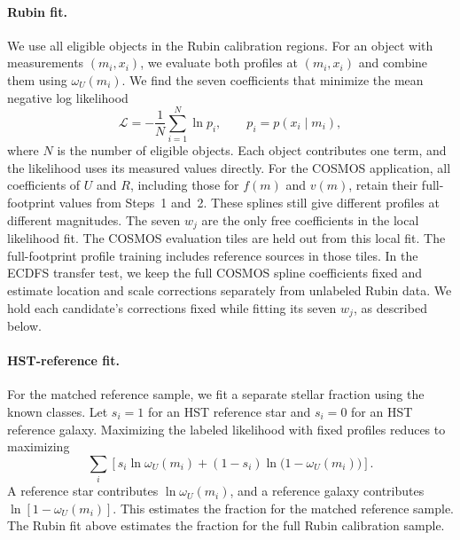 \paragraph{Rubin fit.}
We use all eligible objects in the Rubin calibration regions. For an
object with measurements \((m_i,x_i)\), we evaluate both profiles at
\((m_i,x_i)\) and combine them using \(\omega_U(m_i)\). We find the
seven coefficients that minimize the mean negative log likelihood
\[
 \mathcal L=-\frac{1}{N}\sum_{i=1}^{N}\ln p_i,
 \qquad p_i=p(x_i\mid m_i),
\]
where \(N\) is the number of eligible objects. Each object contributes
one term, and the likelihood uses its measured values directly.
For the COSMOS application, all coefficients of \(U\) and \(R\),
including those for \(f(m)\) and \(v(m)\), retain their full-footprint
values from Steps~1 and~2. These splines still give different profiles
at different magnitudes. The seven \(w_j\) are the only free coefficients
in the local likelihood fit. The COSMOS evaluation tiles are held out
from this local fit. The full-footprint profile training includes
reference sources in those tiles. In the ECDFS transfer test, we keep
the full COSMOS spline coefficients fixed and estimate location and
scale corrections separately from unlabeled Rubin data. We hold each
candidate's corrections fixed while fitting its seven \(w_j\), as
described below.

\paragraph{HST-reference fit.}
For the matched reference sample, we fit a separate stellar fraction
using the known classes. Let \(s_i=1\) for an HST reference star and
\(s_i=0\) for an HST reference galaxy. Maximizing the labeled
likelihood with fixed profiles reduces to maximizing
\begin{equation}
 \sum_i\left[s_i\ln\omega_U(m_i)
          +(1-s_i)\ln\bigl(1-\omega_U(m_i)\bigr)\right].
 \label{eq:v12-reference-weight-likelihood}
\end{equation}
A reference star contributes \(\ln\omega_U(m_i)\), and a reference
galaxy contributes \(\ln[1-\omega_U(m_i)]\). This estimates the
fraction for the matched reference sample. The Rubin fit above estimates
the fraction for the full Rubin calibration sample.

